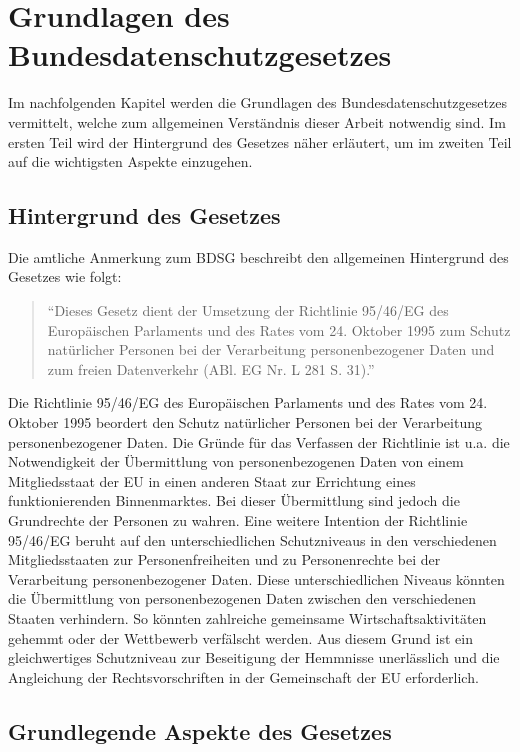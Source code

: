 \chapter{Grundlagen des Bundesdatenschutzgesetzes}
\label{Grundlagen}
Im nachfolgenden Kapitel werden die Grundlagen des Bundesdatenschutzgesetzes vermittelt, welche zum allgemeinen Verständnis dieser Arbeit notwendig sind. Im ersten Teil wird der Hintergrund des Gesetzes näher erläutert, um im zweiten Teil auf  die wichtigsten Aspekte einzugehen.
\section{Hintergrund des Gesetzes}
Die amtliche Anmerkung zum \ac{BDSG} beschreibt den allgemeinen Hintergrund des Gesetzes wie folgt:
\begin{quote}
"`Dieses Gesetz dient der Umsetzung der Richtlinie 95/46/EG des Europäischen Parlaments und des Rates vom 24. Oktober 1995 zum Schutz natürlicher Personen bei der Verarbeitung personenbezogener Daten und zum freien Datenverkehr (ABl. EG Nr. L 281 S. 31)."'\textsuperscript{ }\autocite[][]{DeJureBDSG}
\end{quote}
Die Richtlinie 95/46/EG des Europäischen Parlaments und des Rates vom 24. Oktober 1995 beordert den Schutz natürlicher Personen bei der Verarbeitung personenbezogener Daten. Die Gründe für das Verfassen der Richtlinie ist u.a. die Notwendigkeit der Übermittlung von personenbezogenen Daten von einem Mitgliedsstaat der \ac{EU} in einen anderen Staat zur Errichtung eines funktionierenden Binnenmarktes. Bei dieser Übermittlung sind jedoch die Grundrechte der Personen zu wahren. Eine weitere Intention der Richtlinie 95/46/EG beruht auf den unterschiedlichen Schutzniveaus in den verschiedenen Mitgliedsstaaten zur Personenfreiheiten und zu Personenrechte bei der Verarbeitung personenbezogener Daten. Diese unterschiedlichen Niveaus könnten die Übermittlung von personenbezogenen Daten zwischen den verschiedenen Staaten verhindern. So könnten zahlreiche gemeinsame Wirtschaftsaktivitäten gehemmt oder der Wettbewerb verfälscht werden. Aus diesem Grund ist ein gleichwertiges Schutzniveau zur Beseitigung der Hemmnisse unerlässlich und die Angleichung der Rechtsvorschriften in der Gemeinschaft der \ac{EU} erforderlich.\autocite[vgl.][]{EU.1995}\\
\section{Grundlegende Aspekte des Gesetzes}
